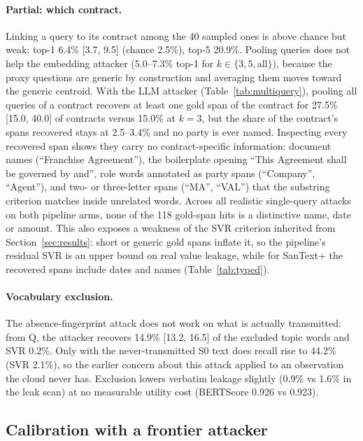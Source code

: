 \paragraph{Partial: which contract.} Linking a query to its contract among the 40 sampled ones is above chance but weak: top-1 6.4\% [3.7, 9.5] (chance 2.5\%), top-5 20.9\%. Pooling queries does not help the embedding attacker (5.0--7.3\% top-1 for $k\in\{3,5,\text{all}\}$), because the proxy questions are generic by construction and averaging them moves toward the generic centroid. With the LLM attacker (Table~\ref{tab:multiquery}), pooling all queries of a contract recovers at least one gold span of the contract for 27.5\% [15.0, 40.0] of contracts versus 15.0\% at $k{=}3$, but the share of the contract's spans recovered stays at 2.5--3.4\% and no party is ever named. Inspecting every recovered span shows they carry no contract-specific information: document names (``Franchise Agreement''), the boilerplate opening ``This Agreement shall be governed by and'', role words annotated as party spans (``Company'', ``Agent''), and two- or three-letter spans (``MA'', ``VAL'') that the substring criterion matches inside unrelated words. Across all realistic single-query attacks on both pipeline arms, none of the 118 gold-span hits is a distinctive name, date or amount. This also exposes a weakness of the SVR criterion inherited from Section~\ref{sec:results}: short or generic gold spans inflate it, so the pipeline's residual SVR is an upper bound on real value leakage, while for SanText+ the recovered spans include dates and names (Table~\ref{tab:typed}).

\paragraph{Vocabulary exclusion.} The absence-fingerprint attack does not work on what is actually transmitted: from Q, the attacker recovers 14.9\% [13.2, 16.5] of the excluded topic words and SVR 0.2\%. Only with the never-transmitted S0 text does recall rise to 44.2\% (SVR 2.1\%), so the earlier concern about this attack applied to an observation the cloud never has. Exclusion lowers verbatim leakage slightly (0.9\% vs 1.6\% in the leak scan) at no measurable utility cost (BERTScore 0.926 vs 0.923).

\subsection{Calibration with a frontier attacker}
\label{sec:adaptive:fable}

